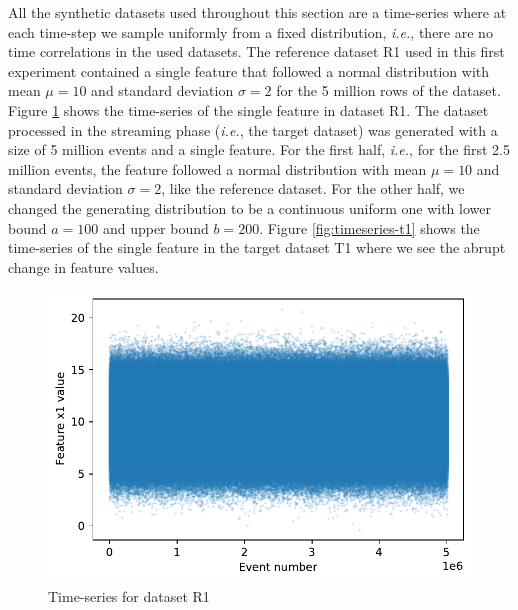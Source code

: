 \documentclass[sigconf]{acmart}
\begin{document}
All the synthetic datasets used throughout this section are a time-series where at each time-step we sample uniformly from a fixed distribution, \textit{i.e.}, there are no time correlations in the used datasets. The reference dataset R1 used in this first experiment contained a single feature that followed a normal distribution with mean $\mu=10$ and standard deviation $\sigma=2$ for the 5 million rows of the dataset. Figure \ref{fig:timeseries-r1} shows the time-series of the single feature in dataset R1. The dataset processed in the streaming phase (\textit{i.e.}, the target dataset) was generated with a size of 5 million events and a single feature. For the first half, \textit{i.e.}, for the first 2.5 million events, the feature followed a normal distribution with mean $\mu=10$ and standard deviation $\sigma=2$, like the reference dataset. For the other half, we changed the generating distribution to be a continuous uniform one with lower bound $a=100$ and upper bound $b=200$. Figure \ref{fig:timeseries-t1} shows the time-series of the single feature in the target dataset T1 where we see the abrupt change in feature values.
\begin{figure}[!htb]
    \begin{center}
      \includegraphics[scale=0.5]{figures/01-reference.pdf}
      \caption{Time-series for dataset R1}
      \label{fig:timeseries-r1}
    \end{center}
\end{figure}
\end{document}
